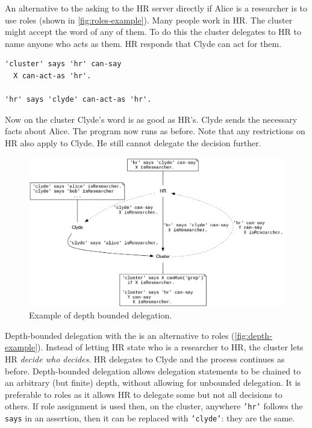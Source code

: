\documentclass[thesis.tex]{subfiles}
\begin{document}
An alternative to the asking to the HR server directly if
Alice is a researcher is to use roles (shown in
\autoref{fig:roles-example}).  Many people work in HR.  The
cluster might accept the word of any of them. 
To do this the cluster delegates to HR to
name anyone who acts as them. HR responds that
Clyde can act for them.
\begin{lstlisting}
'cluster' says 'hr' can-say
  X can-act-as 'hr'.

'hr' says 'clyde' can-act-as 'hr'.
\end{lstlisting}
Now on the cluster Clyde's word is as good as HR's.
Clyde sends the necessary facts about Alice. The program now runs as before.
Note that any restrictions on HR also apply to Clyde.  He still cannot delegate the decision further.

\begin{figure}
  \centering
  \includegraphics[width=\textwidth]{figures/secpal-example-delegation2.png}
  \caption{Example of depth bounded delegation.}
  \label{fig:depth-example}
\end{figure}

Depth-bounded delegation with the
is an alternative to roles
(\autoref{fig:depth-example}).  Instead of letting HR state who is a researcher to HR, the cluster lets HR
\emph{decide who decides}.  HR
delegates to Clyde and the process continues as before.
Depth-bounded delegation allows delegation statements to be chained to
an arbitrary (but finite) depth, without allowing for unbounded
delegation.  It is preferable to roles as it allows HR to
delegate some but not all decisions to others.  If role assignment
is used then, on the cluster, anywhere \texttt{'hr'} follows the
\texttt{says} in an assertion, then it can be replaced with
\texttt{'clyde'}: they are the same.
\end{document}
